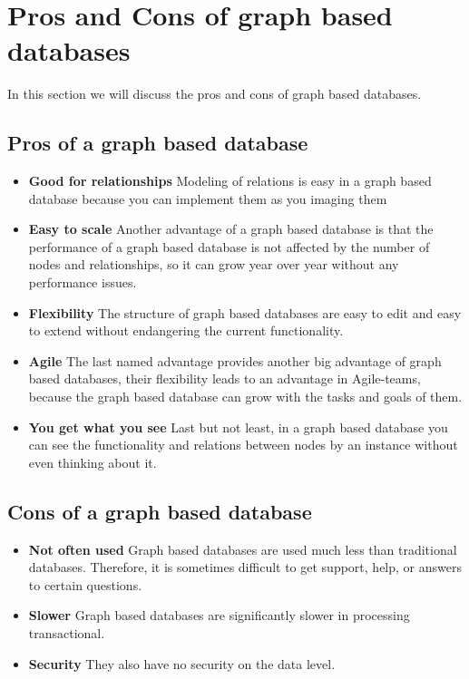 
\section{Pros and Cons of graph based databases}\label{sec:pros-and-cons-of-graph-based-databases}
In this section we will discuss the pros and cons of graph based databases.

\subsection{Pros of a graph based database}\label{subsec:pros-of-a-graph-based-database}\label{subsec:pros}
\begin{itemize}
    \item \textbf{Good for relationships} Modeling of relations is easy in a graph based database because you can implement them as you imaging them
    \item \textbf{Easy to scale} Another advantage of a graph based database is that the performance of a graph based database is not affected by the number of nodes and relationships, so it can grow year over year without any performance issues.
    \item \textbf{Flexibility} The structure of graph based databases are easy to edit and easy to extend without endangering the current functionality.
    \item \textbf{Agile} The last named advantage provides another big advantage of graph based databases, their flexibility leads to an advantage in Agile-teams, because the graph based database can grow with the tasks and goals of them.
    \item \textbf{You get what you see} Last but not least, in a graph based database you can see the functionality and relations between nodes by an instance without even thinking about it.
\end{itemize}

\subsection{Cons of a graph based database}\label{subsec:cons-of-a-graph-based-database}\label{subsec:cons}
\begin{itemize}
    \item \textbf{Not often used} Graph based databases are used much less than traditional databases. Therefore, it is sometimes difficult to get support, help, or answers to certain questions.
    \item \textbf{Slower} Graph based databases are significantly slower in processing transactional.
    \item  \textbf{Security} They also have no security on the data level.
\end{itemize}

